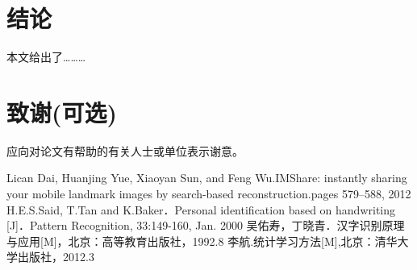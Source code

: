 \documentclass[UTF8]{csoarticle}
\begin{document}
\section{结论}

本文给出了………

\section*{致谢(可选)}

应向对论文有帮助的有关人士或单位表示谢意。



\begin{thebibliography}{3} %
     Lican Dai, Huanjing Yue, Xiaoyan Sun, and Feng Wu.IMShare: instantly sharing your mobile landmark images by search-based reconstruction.pages 579--588, 2012
     H.E.S.Said, T.Tan and K.Baker．Personal identification based on handwriting [J]．Pattern Recognition, 33:149-160, Jan. 2000
     吴佑寿，丁晓青．汉字识别原理与应用[M]，北京：高等教育出版社，1992.8
     李航.统计学习方法[M],北京：清华大学出版社，2012.3


\end{thebibliography}
\end{document}
